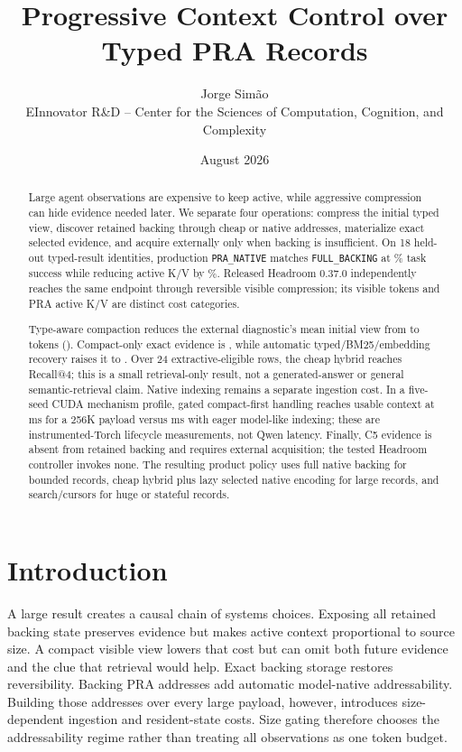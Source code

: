 \documentclass[11pt]{article}
\title{Progressive Context Control over Typed PRA Records}
\author{Jorge Sim\~ao\\EInnovator R\&D -- Center for the Sciences of Computation, Cognition, and Complexity}
\date{August 2026}
\begin{document}
\maketitle

\begin{abstract}
Large agent observations are expensive to keep active, while aggressive
compression can hide evidence needed later. We separate four operations:
compress the initial typed view, discover retained backing through cheap or
native addresses, materialize exact selected evidence, and acquire externally
only when backing is insufficient. On 18 held-out typed-result identities,
production \texttt{PRA\_NATIVE} matches \texttt{FULL\_BACKING} at
\PaperSevenCalNativeSuccessPct\% task success while reducing active K/V by
\PaperSevenCalActiveKVReductionPct\%. Released Headroom 0.37.0 independently
reaches the same \PaperSevenHeadroomTunedSuccess{} endpoint through reversible
visible compression; its visible tokens and PRA active K/V are distinct cost
categories.

Type-aware compaction reduces the external diagnostic's mean initial view from
\PaperSevenCurrentVisible{} to \PaperSevenAwareVisible{} tokens
(\PaperSevenCompressionReduction{}). Compact-only exact evidence is
\PaperSevenAwareCompactOnly{}, while automatic typed/BM25/embedding recovery
raises it to \PaperSevenAwareRecovered{}. Over 24 extractive-eligible rows,
the cheap hybrid reaches \PaperSevenHybridRFour{} Recall@4; this is a small
retrieval-only result, not a generated-answer or general semantic-retrieval
claim. Native indexing remains a separate ingestion cost. In a five-seed CUDA
mechanism profile, gated compact-first handling reaches usable context at
\PaperSevenGatedLargestTTUC{} ms for a 256K payload versus
\PaperSevenEagerLargestTTUC{} ms with eager model-like indexing; these are
instrumented-Torch lifecycle measurements, not Qwen latency. Finally, C5
evidence is absent from retained backing and requires external acquisition;
the tested Headroom controller invokes none. The resulting product policy uses
full native backing for bounded records, cheap hybrid plus lazy selected native
encoding for large records, and search/cursors for huge or stateful records.
\end{abstract}

\section{Introduction}

A large result creates a causal chain of systems choices. Exposing all retained
backing state preserves evidence but makes active context proportional to source size. A
compact visible view lowers that cost but can omit both future evidence and the
clue that retrieval would help. Exact backing storage restores reversibility.
Backing PRA addresses add automatic model-native addressability. Building
those addresses over every large payload, however, introduces size-dependent
ingestion and resident-state costs. Size gating therefore chooses the
addressability regime rather than treating all observations as one token
budget.
\end{document}
